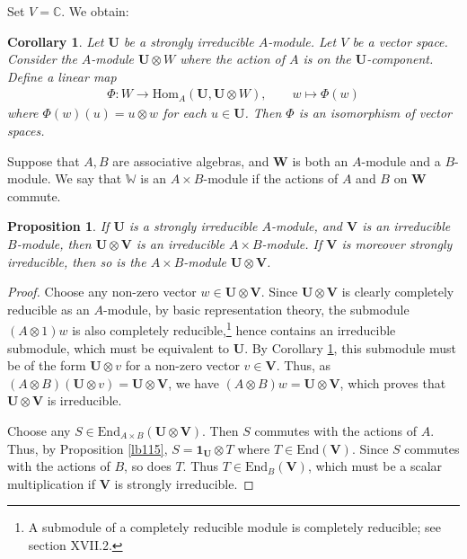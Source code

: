 \documentclass[12pt,b5paper,notitlepage]{report}
\theoremstyle{definition}
\theoremstyle{plain}
\newtheorem{pp}[df]{Proposition}
\newtheorem{co}[df]{Corollary}
\newcommand{\End}{\mathrm{End}} %
\newcommand{\id}{\mathbf{1}}
\newcommand{\Hom}{\mathrm{Hom}}
\newcommand{\mbf}{\mathbf}
\newcommand{\Wbb}{\mathbb W}
\newcommand{\Cbb}{\mathbb C}
\numberwithin{equation}{section}
\begin{document}
Set $V=\Cbb$. We obtain:

\begin{co}\label{lb107}
Let $\mbf U$ be a strongly irreducible $A$-module. Let $V$ be a vector space. Consider the $A$-module $\mbf U\otimes W$ where the action of $A$ is on the $\mbf U$-component. Define a linear  map
\begin{align*}
\Phi:W\rightarrow \Hom_A(\mbf U,\mbf U\otimes W),\qquad w\mapsto \Phi(w)
\end{align*}
where $\Phi(w)(u)=u\otimes w$ for each $u\in\mbf U$. Then $\Phi$ is an isomorphism of vector spaces.
\end{co}




Suppose that $A,B$ are associative algebras, and $\mbf W$ is both an $A$-module and a $B$-module. We say that $\Wbb$ is an $A\times B$-module if the actions of $A$ and $B$ on $\mbf W$ commute.



\begin{pp}\label{lb113}
If $\mbf U$ is a strongly irreducible $A$-module, and $\mbf V$ is an irreducible $B$-module, then $\mbf U\otimes \mbf V$ is an irreducible $A\times B$-module. If $\mbf V$ is moreover strongly irreducible, then so is the $A\times B$-module $\mbf U\otimes \mbf V$.
\end{pp}

\begin{proof}
Choose any non-zero vector $w\in\mbf U\otimes\mbf V$. Since $\mbf U\otimes\mbf V$ is clearly completely reducible as an $A$-module, by basic representation theory, the submodule $(A\otimes 1)w$ is also completely reducible,\footnote{A submodule of a completely reducible module is completely reducible; see \cite{Lang} section XVII.2.} hence contains an irreducible submodule, which must be equivalent to $\mbf U$. By Corollary \ref{lb107}, this submodule must be of the form $\mbf U\otimes v$ for a non-zero vector $v\in\mbf V$. Thus, as $(A\otimes B)(\mbf U\otimes v)=\mbf U\otimes \mbf V$, we have $(A\otimes B)w=\mbf U\otimes \mbf V$, which proves that $\mbf U\otimes\mbf V$ is irreducible.

Choose any $S\in\End_{A\times B}(\mbf U\otimes\mbf V)$. Then $S$ commutes with the actions of $A$. Thus, by Proposition \ref{lb115}, $S=\id_{\mbf U}\otimes T$ where $T\in\End(\mbf V)$. Since $S$ commutes with the actions of $B$, so does $T$. Thus $T\in\End_B(\mbf V)$, which must be a scalar multiplication if $\mbf V$ is strongly irreducible.
\end{proof}
\end{document}
